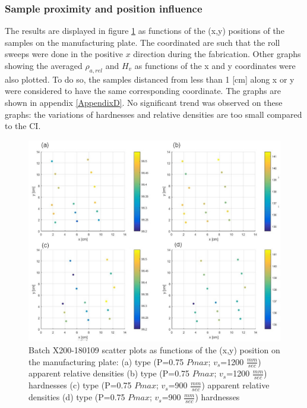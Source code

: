 \subsubsection{Sample proximity and position influence}
The results are displayed in figure \ref{fig:180109-HD} as functions of the (x,y) positions of the samples on the manufacturing plate. The coordinated are such that the roll sweeps were done in the positive $x$ direction during the fabrication. Other graphs showing the averaged $\rho_{a,rel}$ and $H_v$ as functions of the x and y coordinates were also plotted. To do so, the samples distanced from less than 1 [cm] along x or y were considered to have the same corresponding coordinate. The graphs are shown in appendix \ref{AppendixD}. No significant trend was observed on these graphs: the variations of hardnesses and relative densities are too small compared to the CI. \\
\begin{figure}[h!]
\centering
\centerline{\includegraphics[scale=0.62]{Images/180109-HD}}
\decoRule
\caption[Batch X200-180109 scatter plots as functions of the (x,y) position on the manufacturing plate: (a) type (P=0.75 $Pmax$; $v_s$=1200 $\frac{mm}{sec}$) apparent relative densities (b) type (P=0.75 $Pmax$; $v_s$=1200 $\frac{mm}{sec}$) hardnesses (c) type (P=0.75 $Pmax$; $v_s$=900 $\frac{mm}{sec}$) apparent relative densities (d) type (P=0.75 $Pmax$; $v_s$=900 $\frac{mm}{sec}$) hardnesses]{Batch X200-180109 scatter plots as functions of the (x,y) position on the manufacturing plate: (a) type (P=0.75 $Pmax$; $v_s$=1200 $\frac{mm}{sec}$) apparent relative densities (b) type (P=0.75 $Pmax$; $v_s$=1200 $\frac{mm}{sec}$) hardnesses (c) type (P=0.75 $Pmax$; $v_s$=900 $\frac{mm}{sec}$) apparent relative densities (d) type (P=0.75 $Pmax$; $v_s$=900 $\frac{mm}{sec}$) hardnesses}
\label{fig:180109-HD}
\end{figure} 

